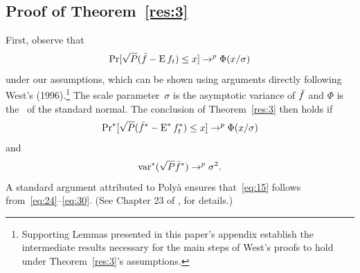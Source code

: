 \documentclass[12pt,fleqn]{article}
\begin{document}
\subsection*{Proof of Theorem~\ref{res:3}}

First, observe that
\begin{equation}\label{eq:24}
  \operatorname{Pr}[\sqrt{P} (\bar f - \operatorname{E} f_t) \leq x] \to^p \Phi(x / \sigma)
\end{equation}
under our assumptions, which can be shown using arguments directly
following West's (1996).\footnote{%
  Supporting Lemmas presented in this paper's appendix establish the
  intermediate results necessary for the main steps of West's proofs
  to hold under Theorem~\ref{res:3}'s assumptions.} %
The scale parameter~$\sigma$ is the asymptotic variance of $\bar f$ and
$\Phi$ is the \cdf\ of the standard normal. The conclusion of
Theorem~\ref{res:3} then holds if
\begin{equation}\label{eq:23}
  \operatorname{Pr}^*[\sqrt{P} (\bar f^* - \operatorname{E}^* f_t^*) \leq x] \to^p \Phi(x / \sigma)
\end{equation}
and
\begin{equation}\label{eq:30}
  \operatorname{var}^*(\sqrt{P} \bar f^*) \to^p \sigma^2.
\end{equation}
A standard argument attributed to Poly{\`a} ensures that~\eqref{eq:15}
follows from~\eqref{eq:24}--\eqref{eq:30}. (See Chapter 23 of
\citealp{Vaa:00}, for details.)
\end{document}
